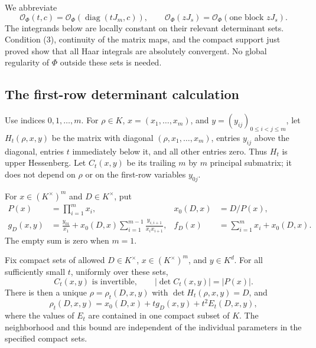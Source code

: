 We abbreviate
\[
 \mathcal O_\Phi(t,c)=\mathcal O_\Phi(\operatorname{diag}(tJ_m,c)),
 \qquad
 \mathcal O_\Phi(zJ_s)=\mathcal O_\Phi(\text{one block }zJ_s).
\]
The integrands below are locally constant on their relevant
determinant sets.  Condition (3), continuity of the matrix maps,
and the compact support just proved show that all Haar integrals
are absolutely convergent.  No global regularity of $\Phi$
outside these sets is needed.

\subsection{The first-row determinant calculation}

Use indices $0,1,\ldots,m$.  For $\rho\in K$, $x=(x_1,\ldots,x_m)$,
and $y=(y_{ij})_{0\le i<j\le m}$, let
$H_t(\rho,x,y)$ be the matrix with diagonal
$(\rho,x_1,\ldots,x_m)$, entries $y_{ij}$ above the diagonal,
entries $t$ immediately below it, and all other entries zero.
Thus $H_t$ is upper Hessenberg.  Let $C_t(x,y)$ be its trailing
$m$ by $m$ principal submatrix; it does not depend on $\rho$ or
on the first-row variables $y_{0j}$.

For $x\in(K^\times)^m$ and $D\in K^\times$, put
\begin{align}
 P(x)&=\prod_{i=1}^m x_i,&
 x_0(D,x)&=D/P(x),\\
 g_D(x,y)&=\frac{y_{01}}{x_1}
     +x_0(D,x)\sum_{i=1}^{m-1}
                       \frac{y_{i,i+1}}{x_ix_{i+1}},&
 f_D(x)&=\sum_{i=1}^m x_i+x_0(D,x).
\end{align}
The empty sum is zero when $m=1$.

\begin{lemma}\label{sg-determinant-expansion}
Fix compact sets of allowed $D\in K^\times$,
$x\in(K^\times)^m$, and $y\in K^d$.  For all sufficiently small
$t$, uniformly over these sets,
\begin{equation}\label{sg-tail-modulus}
 C_t(x,y)\text{ is invertible},\qquad
                  |\det C_t(x,y)|=|P(x)|.
\end{equation}
There is then a unique $\rho=\rho_t(D,x,y)$ with
$\det H_t(\rho,x,y)=D$, and
\begin{equation}\label{sg-rho-expansion}
 \rho_t(D,x,y)=x_0(D,x)+t g_D(x,y)+t^2 E_t(D,x,y),
\end{equation}
where the values of $E_t$ are contained in one compact subset
of $K$.  The neighborhood and this bound are independent of
the individual parameters in the specified compact sets.
\end{lemma}

